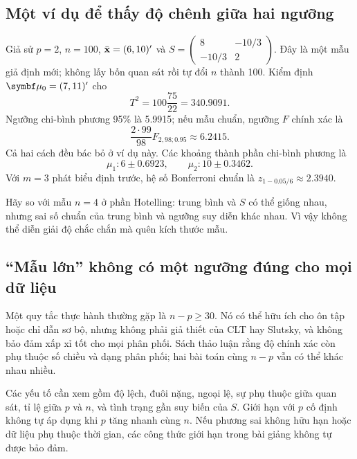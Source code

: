 \subsection{Một ví dụ để thấy độ chênh giữa hai ngưỡng}
\begin{example}[Số tóm tắt giả định, $n=100$]
Giả sử $p=2$, $n=100$, $\bar{\mathbf x}=(6,10)'$ và
$S=\begin{pmatrix}8&-10/3\\-10/3&2\end{pmatrix}$.
Đây là một mẫu giả định mới; không lấy bốn quan sát rồi tự đổi $n$ thành 100.
Kiểm định $\vmu_0=(7,11)'$ cho
\[
 T^2=100\frac{75}{22}=340.9091.
\]
Ngưỡng chi-bình phương 95\% là 5.9915; nếu mẫu chuẩn, ngưỡng $F$ chính
xác là
\[
 \frac{2\cdot99}{98}F_{2,98;0.95}\approx6.2415.
\]
Cả hai cách đều bác bỏ ở ví dụ này.
Các khoảng thành phần chi-bình phương là
\[
 \mu_1:6\pm0.6923,\qquad\mu_2:10\pm0.3462.
\]
Với $m=3$ phát biểu định trước, hệ số Bonferroni chuẩn là
$z_{1-0.05/6}\approx2.3940$.
\end{example}

Hãy so với mẫu $n=4$ ở phần Hotelling: trung bình và $S$ có thể giống nhau,
nhưng sai số chuẩn của trung bình và ngưỡng suy diễn khác nhau. Vì vậy
không thể diễn giải độ chắc chắn mà quên kích thước mẫu.

\subsection{``Mẫu lớn'' không có một ngưỡng đúng cho mọi dữ liệu}
Một quy tắc thực hành thường gặp là $n-p\ge30$. Nó có thể hữu ích cho
ôn tập hoặc chỉ dẫn sơ bộ, nhưng không phải giả thiết của CLT hay Slutsky,
và không bảo đảm xấp xỉ tốt cho mọi phân phối.
Sách thảo luận rằng độ chính xác còn phụ thuộc số chiều và dạng phân phối;
hai bài toán cùng $n-p$ vẫn có thể khác nhau nhiều.

Các yếu tố cần xem gồm độ lệch, đuôi nặng, ngoại lệ, sự phụ thuộc giữa
quan sát, tỉ lệ giữa $p$ và $n$, và tình trạng gần suy biến của $S$.
Giới hạn với $p$ cố định không tự áp dụng khi $p$ tăng nhanh cùng $n$.
Nếu phương sai không hữu hạn hoặc dữ liệu phụ thuộc thời gian, các công
thức giới hạn trong bài giảng không tự được bảo đảm.



